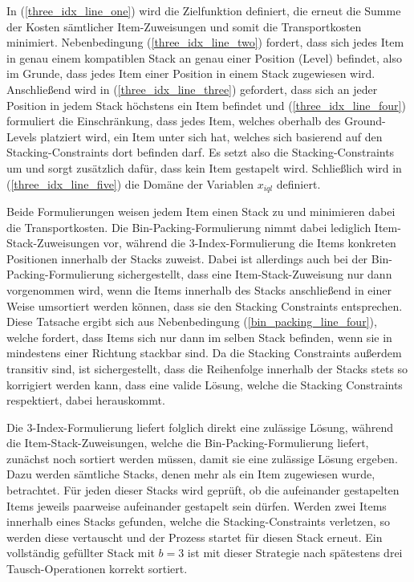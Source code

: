 In (\ref{three_idx_line_one}) wird die Zielfunktion definiert, die erneut die Summe der Kosten sämtlicher Item-Zuweisungen
und somit die Transportkosten minimiert.
Nebenbedingung (\ref{three_idx_line_two}) fordert, dass sich jedes Item in genau einem kompatiblen Stack an genau
einer Position (Level) befindet,
also im Grunde, dass jedes Item einer Position in einem Stack zugewiesen wird.
Anschließend wird in (\ref{three_idx_line_three}) gefordert, dass sich an jeder Position in jedem Stack höchstens ein Item befindet und
(\ref{three_idx_line_four}) formuliert die Einschränkung, dass jedes Item, welches oberhalb des Ground-Levels platziert wird,
ein Item unter sich hat, welches sich basierend auf den Stacking-Constraints dort befinden darf.
Es setzt also die Stacking-Constraints um und sorgt zusätzlich dafür, dass kein Item  gestapelt wird.
Schließlich wird in (\ref{three_idx_line_five}) die Domäne der Variablen $x_{iql}$ definiert.

Beide Formulierungen weisen jedem Item einen Stack zu und minimieren dabei die Transportkosten.
Die Bin-Packing-Formulierung nimmt dabei lediglich Item-Stack-Zuweisungen vor, während die 3-Index-Formulierung die
Items konkreten Positionen innerhalb der Stacks zuweist. Dabei ist allerdings auch bei der Bin-Packing-Formulierung
sichergestellt, dass eine Item-Stack-Zuweisung nur dann vorgenommen wird, wenn die Items innerhalb des Stacks anschließend
in einer Weise umsortiert werden können, dass sie den Stacking Constraints entsprechen. Diese Tatsache ergibt sich aus Nebenbedingung (\ref{bin_packing_line_four}), welche fordert, dass Items sich nur dann im selben Stack befinden, wenn sie in mindestens einer Richtung stackbar sind.
Da die Stacking Constraints außerdem transitiv sind, ist sichergestellt, dass die Reihenfolge innerhalb der Stacks stets so korrigiert werden kann, dass eine valide Lösung, welche die Stacking Constraints respektiert, dabei herauskommt.

Die 3-Index-Formulierung liefert folglich direkt eine zulässige Lösung, während die Item-Stack-Zuweisungen, welche die Bin-Packing-Formulierung liefert, zunächst noch sortiert werden müssen, damit sie eine zulässige Lösung ergeben.
Dazu werden sämtliche Stacks, denen mehr als ein Item zugewiesen wurde, betrachtet. Für jeden
dieser Stacks wird geprüft, ob die aufeinander gestapelten Items jeweils paarweise aufeinander gestapelt sein dürfen.
Werden zwei Items innerhalb eines Stacks gefunden, welche die Stacking-Constraints verletzen, so werden diese
vertauscht und der Prozess startet für diesen Stack erneut. Ein vollständig gefüllter Stack mit $b = 3$ ist mit dieser
Strategie nach spätestens drei Tausch-Operationen korrekt sortiert.

